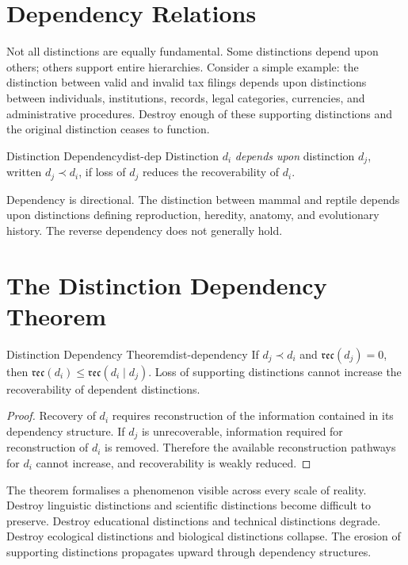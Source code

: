 \documentclass[12pt,twoside,openright]{book}
\newcommand{\reco}{\mathfrak{rec}}
\begin{document}
\section{Dependency Relations}
\label{sec:ch12-dependency}

Not all distinctions are equally fundamental. Some
distinctions depend upon others; others support entire
hierarchies. Consider a simple example: the distinction
between valid and invalid tax filings depends upon
distinctions between individuals, institutions, records,
legal categories, currencies, and administrative
procedures. Destroy enough of these supporting distinctions
and the original distinction ceases to function.

\begin{definition}{Distinction Dependency}{dist-dep}
  Distinction $d_i$ \emph{depends upon} distinction $d_j$,
  written $d_j \prec d_i$, if loss of $d_j$ reduces the
  recoverability of $d_i$.
\end{definition}

Dependency is directional. The distinction between mammal
and reptile depends upon distinctions defining
reproduction, heredity, anatomy, and evolutionary history.
The reverse dependency does not generally hold.

\section{The Distinction Dependency Theorem}
\label{sec:ch12-dependency-thm}

\begin{theorem}{Distinction Dependency Theorem}{dist-dependency}
  If $d_j \prec d_i$ and $\reco(d_j) = 0$, then
  $\reco(d_i) \le \reco(d_i \mid d_j)$. Loss of supporting
  distinctions cannot increase the recoverability of
  dependent distinctions.
\end{theorem}

\begin{proof}
  Recovery of $d_i$ requires reconstruction of the
  information contained in its dependency structure. If
  $d_j$ is unrecoverable, information required for
  reconstruction of $d_i$ is removed. Therefore the
  available reconstruction pathways for $d_i$ cannot
  increase, and recoverability is weakly reduced.
\end{proof}

The theorem formalises a phenomenon visible across every
scale of reality. Destroy linguistic distinctions and
scientific distinctions become difficult to preserve.
Destroy educational distinctions and technical distinctions
degrade. Destroy ecological distinctions and biological
distinctions collapse. The erosion of supporting
distinctions propagates upward through dependency
structures.
\end{document}
